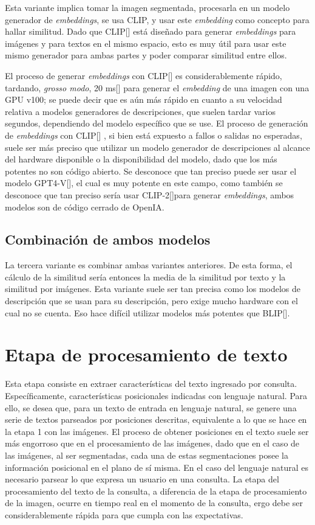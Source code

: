Esta variante implica tomar la imagen segmentada, procesarla en un modelo generador de \textit{embeddings}, se usa CLIP, y usar este \textit{embedding} como concepto para hallar similitud. Dado que CLIP[\cite{clip}] está diseñado para generar \textit{embeddings} para imágenes y para textos en el mismo espacio, esto es muy útil para usar este mismo generador para ambas partes y poder comparar similitud entre ellos.

El proceso de generar \textit{embeddings} con CLIP[\cite{clip}] es considerablemente rápido, tardando, \textit{grosso modo}, 20 ms[\cite{BuildingImageClip-20ms}] para generar el \textit{embedding} de una imagen con una GPU v100; se puede decir que es aún más rápido en cuanto a su velocidad relativa a modelos generadores de descripciones, que suelen tardar varios segundos, dependiendo del modelo específico que se use. El proceso de generación de \textit{embeddings} con CLIP[\cite{clip}] , si bien est\'a expuesto a fallos o salidas no esperadas, suele ser más preciso que utilizar un modelo generador de descripciones al alcance del hardware disponible o la disponibilidad del modelo, dado que los más potentes no son código abierto. Se desconoce que tan preciso puede ser usar el modelo GPT4-V[\cite{gpt-4v}], el cual es muy potente en este campo, como también se desconoce que tan preciso sería usar CLIP-2[\cite{clip2-paper}]para generar \textit{embeddings}, ambos modelos son de código cerrado de OpenIA.

\subsection{Combinaci\'on de ambos modelos}
La tercera variante es combinar ambas variantes anteriores. De esta forma, el cálculo de la similitud sería entonces la media de la similitud por texto y la similitud por imágenes. Esta variante suele ser tan precisa como los modelos de descripción que se usan para su descripción, pero exige mucho hardware con el cual no se cuenta. Eso hace dif\'icil utilizar modelos más potentes que BLIP[\cite{blip}].

\section{Etapa de procesamiento de texto}

Esta etapa consiste en extraer características del texto ingresado por consulta. Específicamente, características posicionales indicadas con lenguaje natural. Para ello, se desea que, para un texto de entrada en lenguaje natural, se genere una serie de textos parseados por posiciones descritas, equivalente a lo que se hace en la etapa 1 con las imágenes. El proceso de obtener posiciones en el texto suele ser más engorroso que en el procesamiento de las imágenes, dado que en el caso de las imágenes, al ser segmentadas, cada una de estas segmentaciones posee la información posicional en el plano de sí misma. En el caso del lenguaje natural es necesario parsear lo que expresa un usuario en una consulta. La etapa del procesamiento del texto de la consulta, a diferencia de la etapa de procesamiento de la imagen, ocurre en tiempo real en el momento de la consulta, ergo debe ser considerablemente rápida para que cumpla con las expectativas.


